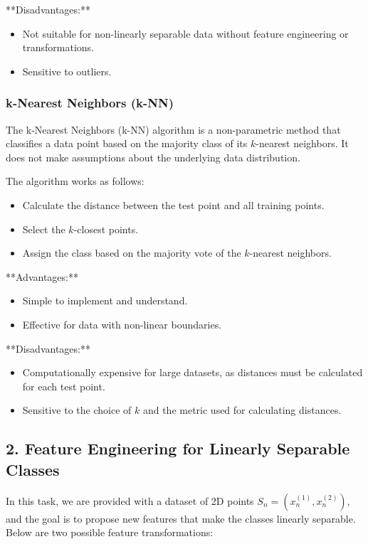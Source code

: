 **Disadvantages:**
\begin{itemize}
    \item Not suitable for non-linearly separable data without feature engineering or transformations.
    \item Sensitive to outliers.
\end{itemize}

\subsubsection*{k-Nearest Neighbors (k-NN)}

The k-Nearest Neighbors (k-NN) algorithm is a non-parametric method that classifies a data point based on the majority class of its \( k \)-nearest neighbors. It does not make assumptions about the underlying data distribution.

The algorithm works as follows:
\begin{itemize}
    \item Calculate the distance between the test point and all training points.
    \item Select the \( k \)-closest points.
    \item Assign the class based on the majority vote of the \( k \)-nearest neighbors.
\end{itemize}

**Advantages:**
\begin{itemize}
    \item Simple to implement and understand.
    \item Effective for data with non-linear boundaries.
\end{itemize}

**Disadvantages:**
\begin{itemize}
    \item Computationally expensive for large datasets, as distances must be calculated for each test point.
    \item Sensitive to the choice of \( k \) and the metric used for calculating distances.
\end{itemize}

\subsection*{2. Feature Engineering for Linearly Separable Classes}

In this task, we are provided with a dataset of 2D points \( S_n = (x_n^{(1)}, x_n^{(2)}) \), and the goal is to propose new features that make the classes linearly separable. Below are two possible feature transformations:

